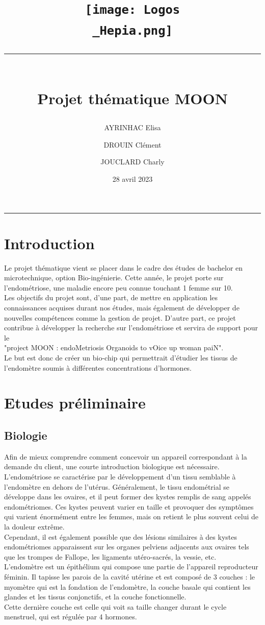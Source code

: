 \documentclass[a4paper, 11pt]{article}
\title{
    \vspace{-2.5cm}
    \centering\texttt{[image: Logos\\\_Hepia.png]}\\
    \centering\rule{17cm}{0.1mm}\vspace*{0.4in}\\
    \centering Projet thématique MOON}
\author[1]{AYRINHAC Elisa}
\author[2]{DROUIN Clément}
\author[3]{JOUCLARD Charly}
\affil[1]{HEPIA, MT2, elisa.ayrinhac@hes-so.ch}
\affil[2]{HEPIA, MT2, clement.drouin@hes-so.ch}
\affil[3]{HEPIA, MT2, charly.jouclard@hes-so.ch}
\date{28 avril 2023}
\begin{document}
\maketitle
\thispagestyle{empty}
\begin{center}
    \rule{\textwidth}{0.1mm}
\end{center}
\vspace{-1cm}
\section*{Introduction}
Le projet thématique vient se placer dans le cadre des études de bachelor en microtechnique, option Bio-ingénierie. Cette année, le projet porte sur l'endométriose, une maladie encore peu connue touchant 1 femme sur 10.\\
Les objectifs du projet sont, d'une part, de mettre en application les connaissances acquises durant nos études, mais également de développer de nouvelles compétences comme la gestion de projet.
D'autre part, ce projet contribue à développer la recherche sur l'endométriose et servira de support pour le \\
"project MOON : endoMetriosis Organoids to vOice up woman paiN".\\
Le but est donc de créer un bio-chip qui permettrait d'étudier les tissus de l'endomètre soumis à différentes concentrations d'hormones.
\newpage
\tableofcontents
\newpage
\section{Etudes préliminaire}
\subsection{Biologie}
Afin de mieux comprendre comment concevoir un appareil correspondant à la demande du client, une courte introduction biologique est nécessaire.\\
L'endométriose se caractérise par le développement d'un tissu semblable à l'endomètre en dehors de l'utérus. Généralement, le tissu endométrial se développe dans les ovaires, et il peut former des kystes remplis de sang appelés endométriomes. Ces kystes peuvent varier en taille et provoquer des symptômes qui varient énormément entre les femmes, mais on retient le plus souvent celui de la douleur extrême.\\
Cependant, il est également possible que des lésions similaires à des kystes endométriomes apparaissent sur les organes pelviens adjacents aux ovaires tels que les trompes de Fallope, les ligaments utéro-sacrés, la vessie, etc.\\
L'endomètre est un épithélium qui compose une partie de l'appareil reproducteur féminin. Il tapisse les parois de la cavité utérine et est composé de 3 couches : le myomètre qui est la fondation de l'endomètre, la couche basale qui contient les glandes et les tissus conjonctifs, et la couche fonctionnelle.\\
Cette dernière couche est celle qui voit sa taille changer durant le cycle menstruel, qui est régulée par 4 hormones.
\end{document}
